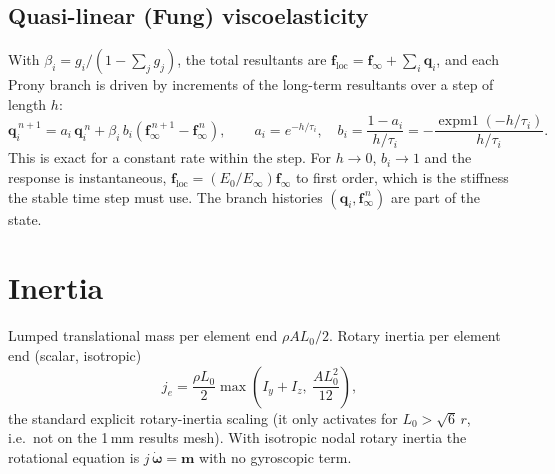\documentclass[11pt,a4paper]{article}
\newcommand{\vect}[1]{\bm{#1}}
\begin{document}
\subsection{Quasi-linear (Fung) viscoelasticity}
With $\beta_i = g_i/(1-\sum_j g_j)$, the total resultants are
$\vect{f}_\mathrm{loc} = \vect{f}_\infty + \sum_i \vect{q}_i$, and each Prony branch is driven by increments
of the long-term resultants over a step of length $h$:
\begin{equation}
\vect{q}_i^{\,n+1} = a_i\,\vect{q}_i^{\,n} + \beta_i\,b_i\left(\vect{f}_\infty^{\,n+1}-\vect{f}_\infty^{\,n}\right),
\qquad a_i = e^{-h/\tau_i},\quad b_i = \frac{1-a_i}{h/\tau_i} = -\frac{\operatorname{expm1}(-h/\tau_i)}{h/\tau_i}.
\label{eq:prony}
\end{equation}
This is exact for a constant rate within the step. For $h\to0$, $b_i\to1$ and the response is instantaneous,
$\vect{f}_\mathrm{loc} = (E_0/E_\infty)\vect{f}_\infty$ to first order, which is the stiffness the stable time
step must use. The branch histories $(\vect{q}_i,\vect{f}_\infty^{\,n})$ are part of the state.

\section{Inertia}
\label{sec:mass}
Lumped translational mass per element end $\rho A L_0/2$. Rotary inertia per element end (scalar, isotropic)
\begin{equation}
j_e = \frac{\rho L_0}{2}\max\!\left(I_y + I_z,\ \frac{A L_0^2}{12}\right),
\end{equation}
the standard explicit rotary-inertia scaling (it only activates for $L_0 > \sqrt{6}\,r$, i.e.\ not on the
1\,mm results mesh). With isotropic nodal rotary inertia the rotational equation is $j\,\dot{\vect\omega} =
\vect{m}$ with no gyroscopic term.

\end{document}
